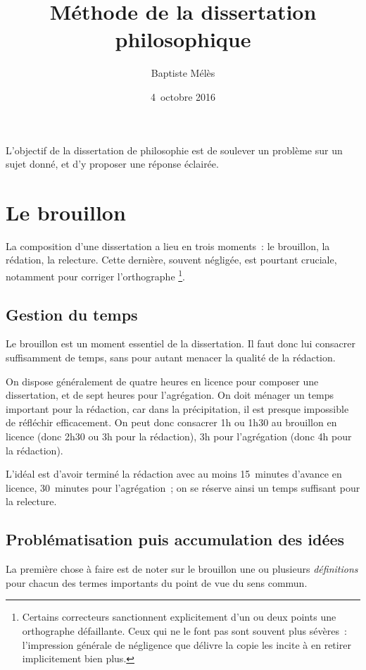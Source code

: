 \documentclass[a4paper]{article}
\title{Méthode de la dissertation philosophique}
\author{Baptiste Mélès}
\date{4 octobre 2016}
\begin{document}
\maketitle

\setcounter{tocdepth}{3}
\tableofcontents
\vspace*{1cm}

L'objectif de la dissertation de philosophie est de soulever un problème
sur un sujet donné, et d'y proposer une réponse éclairée.


\section{Le brouillon}
\label{sec-1}


La composition d'une dissertation a lieu en trois moments : le
brouillon, la rédation, la relecture. Cette dernière, souvent négligée,
est pourtant cruciale, notamment pour corriger l'orthographe \footnote{Certains correcteurs sanctionnent explicitement d'un ou deux points
    une orthographe défaillante. Ceux qui ne le font pas sont souvent
    plus sévères : l'impression générale de négligence que délivre la
    copie les incite à en retirer implicitement bien plus.
 }.
\subsection{Gestion du temps}
\label{sec-1-1}


Le brouillon est un moment essentiel de la dissertation. Il faut donc
lui consacrer suffisamment de temps, sans pour autant menacer la qualité
de la rédaction.

On dispose généralement de quatre heures en licence pour composer une
dissertation, et de sept heures pour l'agrégation. On doit ménager un
temps important pour la rédaction, car dans la précipitation, il est
presque impossible de réfléchir efficacement. On peut donc consacrer 1h
ou 1h30 au brouillon en licence (donc 2h30 ou 3h pour la rédaction), 3h
pour l'agrégation (donc 4h pour la rédaction).

L'idéal est d'avoir terminé la rédaction avec au moins 15 minutes
d'avance en licence, 30 minutes pour l'agrégation ; on se réserve ainsi
un temps suffisant pour la relecture.
\subsection{Problématisation puis accumulation des idées}
\label{sec-1-2}


La première chose à faire est de noter sur le brouillon une ou plusieurs
\emph{définitions} pour chacun des termes importants du point de vue du sens
commun.
\end{document}
